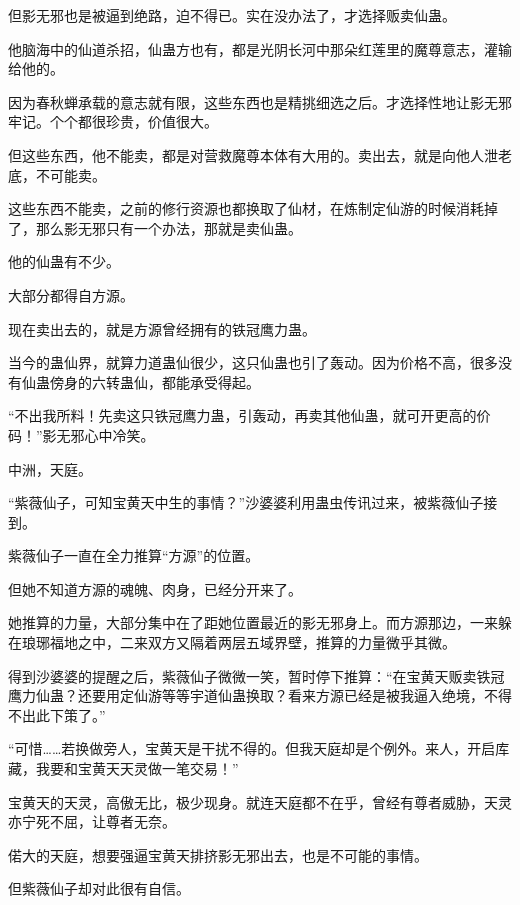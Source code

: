 \begin{this_body}
但影无邪也是被逼到绝路，迫不得已。实在没办法了，才选择贩卖仙蛊。

他脑海中的仙道杀招，仙蛊方也有，都是光阴长河中那朵红莲里的魔尊意志，灌输给他的。

因为春秋蝉承载的意志就有限，这些东西也是精挑细选之后。才选择性地让影无邪牢记。个个都很珍贵，价值很大。

但这些东西，他不能卖，都是对营救魔尊本体有大用的。卖出去，就是向他人泄老底，不可能卖。

这些东西不能卖，之前的修行资源也都换取了仙材，在炼制定仙游的时候消耗掉了，那么影无邪只有一个办法，那就是卖仙蛊。

他的仙蛊有不少。

大部分都得自方源。

现在卖出去的，就是方源曾经拥有的铁冠鹰力蛊。

当今的蛊仙界，就算力道蛊仙很少，这只仙蛊也引了轰动。因为价格不高，很多没有仙蛊傍身的六转蛊仙，都能承受得起。

“不出我所料！先卖这只铁冠鹰力蛊，引轰动，再卖其他仙蛊，就可开更高的价码！”影无邪心中冷笑。

中洲，天庭。

“紫薇仙子，可知宝黄天中生的事情？”沙婆婆利用蛊虫传讯过来，被紫薇仙子接到。

紫薇仙子一直在全力推算“方源”的位置。

但她不知道方源的魂魄、肉身，已经分开来了。

她推算的力量，大部分集中在了距她位置最近的影无邪身上。而方源那边，一来躲在琅琊福地之中，二来双方又隔着两层五域界壁，推算的力量微乎其微。

得到沙婆婆的提醒之后，紫薇仙子微微一笑，暂时停下推算：“在宝黄天贩卖铁冠鹰力仙蛊？还要用定仙游等等宇道仙蛊换取？看来方源已经是被我逼入绝境，不得不出此下策了。”

“可惜……若换做旁人，宝黄天是干扰不得的。但我天庭却是个例外。来人，开启库藏，我要和宝黄天天灵做一笔交易！”

宝黄天的天灵，高傲无比，极少现身。就连天庭都不在乎，曾经有尊者威胁，天灵亦宁死不屈，让尊者无奈。

偌大的天庭，想要强逼宝黄天排挤影无邪出去，也是不可能的事情。

但紫薇仙子却对此很有自信。

\end{this_body}

